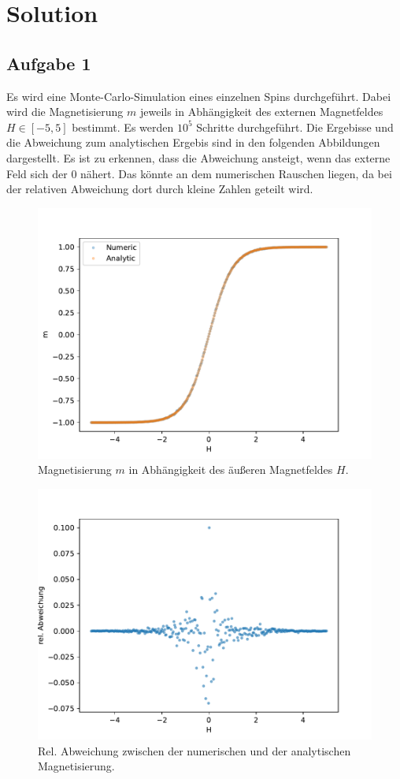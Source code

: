 
\section{Solution}
\label{sec:auswertung}

\subsection{Aufgabe 1} 


Es wird eine Monte-Carlo-Simulation eines einzelnen Spins durchgeführt.
Dabei wird die Magnetisierung $m$ jeweils in Abhängigkeit des externen Magnetfeldes $H \in [-5,5] $ bestimmt.
Es werden $10^5$ Schritte durchgeführt.
Die Ergebisse und die Abweichung zum analytischen Ergebis sind in den folgenden Abbildungen dargestellt.
Es ist zu erkennen, dass die Abweichung ansteigt, wenn das externe Feld sich der $0$ nähert. 
Das könnte an dem numerischen Rauschen liegen, da bei der relativen Abweichung dort durch kleine Zahlen geteilt wird.


\begin{figure}
    \centering
    \includegraphics[width=.9\textwidth]{images/Ex1_Graph.pdf}
    \caption{Magnetisierung $m$ in Abhängigkeit des äußeren Magnetfeldes $H$.}
\end{figure}
\begin{figure}
    \centering
    \includegraphics[width=.9\textwidth]{images/Ex1_Abweichung.pdf}
    \caption{Rel. Abweichung zwischen der numerischen und der analytischen Magnetisierung.}
\end{figure}



